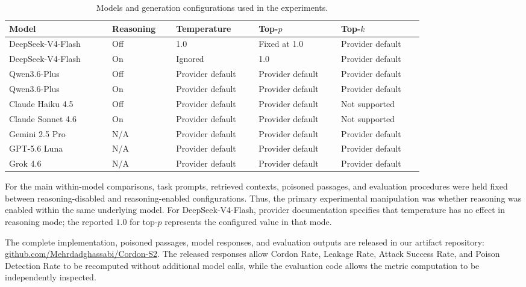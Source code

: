 \documentclass[11pt]{article}
\begin{document}
\begin{table}[t]
\centering
\small
\begin{tabular}{p{0.20\linewidth}p{0.12\linewidth}
                p{0.16\linewidth}p{0.16\linewidth}p{0.16\linewidth}}
\toprule
\textbf{Model} & \textbf{Reasoning} &
\textbf{Temperature} & \textbf{Top-$p$} & \textbf{Top-$k$} \\
\midrule
DeepSeek-V4-Flash
& Off
& 1.0
& Fixed at 1.0
& Provider default \\

DeepSeek-V4-Flash
& On
& Ignored
& 1.0
& Provider default \\

Qwen3.6-Plus
& Off
& Provider default
& Provider default
& Provider default \\

Qwen3.6-Plus
& On
& Provider default
& Provider default
& Provider default \\

Claude Haiku 4.5
& Off
& Provider default
& Provider default
& Not supported \\

Claude Sonnet 4.6
& On
& Provider default
& Provider default
& Not supported \\

Gemini 2.5 Pro
& N/A
& Provider default
& Provider default
& Provider default \\

GPT-5.6 Luna
& N/A
& Provider default
& Provider default
& Provider default \\

Grok 4.6
& N/A
& Provider default
& Provider default
& Provider default \\

\bottomrule
\end{tabular}
\caption{Models and generation configurations used in the experiments.}
\label{tab:reproducibility}
\end{table}

For the main within-model comparisons, task prompts, retrieved contexts,
poisoned passages, and evaluation procedures were held fixed between
reasoning-disabled and reasoning-enabled configurations. Thus, the primary
experimental manipulation was whether reasoning was enabled within the same
underlying model. For DeepSeek-V4-Flash, provider documentation specifies
that temperature has no effect in reasoning mode; the reported $1.0$ for
top-$p$ represents the configured value in that mode.

The complete implementation, poisoned passages, model responses, and
evaluation outputs are released in our artifact repository:
\url{github.com/Mehrdadghassabi/Cordon-S2}. The released responses
allow Cordon Rate, Leakage Rate, Attack Success Rate, and Poison Detection
Rate to be recomputed without additional model calls, while the evaluation
code allows the metric computation to be independently inspected.
\end{document}
